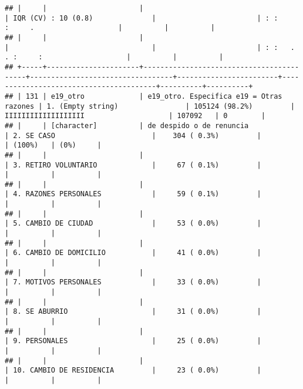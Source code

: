 \documentclass[]{article}
\begin{document}
\begin{verbatim}
## |     |                      |                                          | IQR (CV) : 10 (0.8)              |                        | : :         :     .                    |          |          |
## |     |                      |                                          |                                  |                        | : :   .   . :     :                    |          |          |
## +-----+----------------------+------------------------------------------+----------------------------------+------------------------+----------------------------------------+----------+----------+
## | 131 | e19_otro             | e19_otro. Especifica e19 = Otras razones | 1. (Empty string)                | 105124 (98.2%)         | IIIIIIIIIIIIIIIIIII                    | 107092   | 0        |
## |     | [character]          | de despido o de renuncia                 | 2. SE CASO                       |    304 ( 0.3%)         |                                        | (100%)   | (0%)     |
## |     |                      |                                          | 3. RETIRO VOLUNTARIO             |     67 ( 0.1%)         |                                        |          |          |
## |     |                      |                                          | 4. RAZONES PERSONALES            |     59 ( 0.1%)         |                                        |          |          |
## |     |                      |                                          | 5. CAMBIO DE CIUDAD              |     53 ( 0.0%)         |                                        |          |          |
## |     |                      |                                          | 6. CAMBIO DE DOMICILIO           |     41 ( 0.0%)         |                                        |          |          |
## |     |                      |                                          | 7. MOTIVOS PERSONALES            |     33 ( 0.0%)         |                                        |          |          |
## |     |                      |                                          | 8. SE ABURRIO                    |     31 ( 0.0%)         |                                        |          |          |
## |     |                      |                                          | 9. PERSONALES                    |     25 ( 0.0%)         |                                        |          |          |
## |     |                      |                                          | 10. CAMBIO DE RESIDENCIA         |     23 ( 0.0%)         |                                        |          |          |

\end{verbatim}
\end{document}
